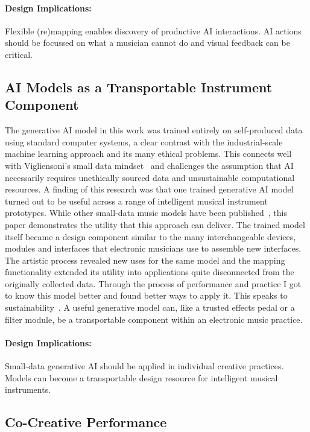 \documentclass[sigconf]{nimeart}
\begin{document}
\paragraph{Design Implications:} Flexible (re)mapping enables discovery of productive AI interactions. AI actions should be focussed on what a musician cannot do and visual feedback can be critical.

\subsection{AI Models as a Transportable Instrument Component}

The generative AI model in this work was trained entirely on self-produced data using standard computer systems, a clear contrast with the industrial-scale machine learning approach and its many ethical problems. This connects well with Vigliensoni's small data mindset~\cite{Vigliensoni:2022} and challenges the assumption that AI necessarily requires unethically sourced data and unsustainable computational resources.
A finding of this research was that one trained generative AI model turned out to be useful across a range of intelligent musical instrument prototypes.
While other small-data music models have been published~\cite[e.g.,][]{stefansdottir_intelligent_2025}, this paper demonstrates the utility that this approach can deliver.
The trained model itself became a design component similar to the many interchangeable devices, modules and interfaces that electronic musicians use to assemble new interfaces. 
The artistic process revealed new uses for the same model and the mapping functionality extended its utility into applications quite disconnected from the originally collected data. 
Through the process of performance and practice I got to know this model better and found better ways to apply it.
This speaks to sustainability~\cite{sustainable-internet-of-musical-things}. 
A useful generative model can, like a trusted effects pedal or a filter module, be a transportable component within an electronic music practice.

\paragraph{Design Implications:} Small-data generative AI should be applied in individual creative practices. Models can become a transportable design resource for intelligent musical instruments.

\subsection{Co-Creative Performance}
\end{document}
